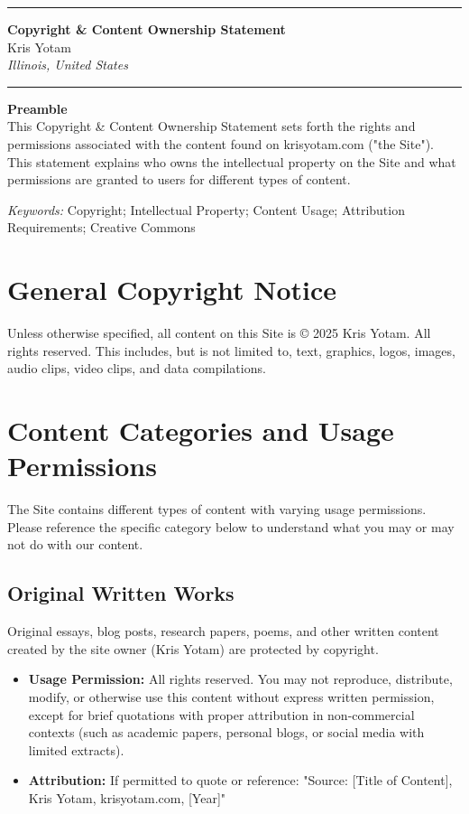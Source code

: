 \documentclass[11pt]{article}
\newcommand{\TitleLine}{\noindent\rule{\textwidth}{0.4pt}}
\begin{document}
\onehalfspacing

\vspace*{-1em}
\TitleLine
\vspace{0.5em}
\begin{center}
  {\Large\bfseries Copyright \& Content Ownership Statement}\\[0.75em]
  {\normalsize Kris Yotam}\\
  {\itshape Illinois, United States}
\end{center}
\vspace{0.5em}
\TitleLine

\vspace{1.5em}

\noindent\textbf{Preamble}\\
This Copyright \& Content Ownership Statement sets forth the rights and permissions associated with the content found on krisyotam.com ("the Site"). This statement explains who owns the intellectual property on the Site and what permissions are granted to users for different types of content.

\vspace{0.75em}
\noindent\textit{Keywords:} Copyright; Intellectual Property; Content Usage; Attribution Requirements; Creative Commons

\vspace{1.5em}

\section{General Copyright Notice}
Unless otherwise specified, all content on this Site is © 2025 Kris Yotam. All rights reserved. This includes, but is not limited to, text, graphics, logos, images, audio clips, video clips, and data compilations.

\section{Content Categories and Usage Permissions}
The Site contains different types of content with varying usage permissions. Please reference the specific category below to understand what you may or may not do with our content.

\subsection{Original Written Works}
Original essays, blog posts, research papers, poems, and other written content created by the site owner (Kris Yotam) are protected by copyright.
\begin{itemize}
  \item \textbf{Usage Permission:} All rights reserved. You may not reproduce, distribute, modify, or otherwise use this content without express written permission, except for brief quotations with proper attribution in non-commercial contexts (such as academic papers, personal blogs, or social media with limited extracts).
  \item \textbf{Attribution:} If permitted to quote or reference: "Source: [Title of Content], Kris Yotam, krisyotam.com, [Year]"
\end{itemize}
\end{document}
